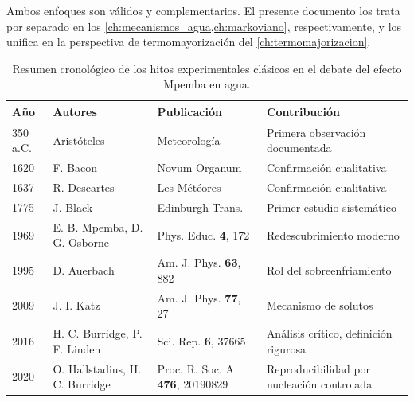 \noindent Ambos enfoques son válidos y complementarios. El presente documento los 
trata por separado en los \cref{ch:mecanismos_agua,ch:markoviano}, respectivamente, 
y los unifica en la perspectiva de termomayorización del 
\cref{ch:termomajorizacion}.

\begin{table}[h]
\centering
\caption{Resumen cronológico de los hitos experimentales clásicos en el debate del 
efecto Mpemba en agua.}
\label{tab:historial_experimental}
\small
\begin{tabularx}{\textwidth}{lll>{\raggedright\arraybackslash}X}
\toprule
\textbf{Año} & \textbf{Autores} & \textbf{Publicación} & \textbf{Contribución} \\
\midrule
350 a.C. & Aristóteles & Meteorología & Primera observación documentada \\
1620 & F. Bacon & Novum Organum & Confirmación cualitativa \\
1637 & R. Descartes & Les Météores & Confirmación cualitativa \\
1775 & J. Black & Edinburgh Trans. & Primer estudio sistemático \\
1969 & E. B. Mpemba, D. G. Osborne & Phys. Educ. \textbf{4}, 172 & Redescubrimiento moderno \\
1995 & D. Auerbach & Am. J. Phys. \textbf{63}, 882 & Rol del sobreenfriamiento \\
2009 & J. I. Katz & Am. J. Phys. \textbf{77}, 27 & Mecanismo de solutos \\
2016 & H. C. Burridge, P. F. Linden & Sci. Rep. \textbf{6}, 37665 & Análisis crítico, definición rigurosa \\
2020 & O. Hallstadius, H. C. Burridge & Proc. R. Soc. A \textbf{476}, 20190829 & Reproducibilidad por nucleación controlada \\
\bottomrule
\end{tabularx}
\end{table}
